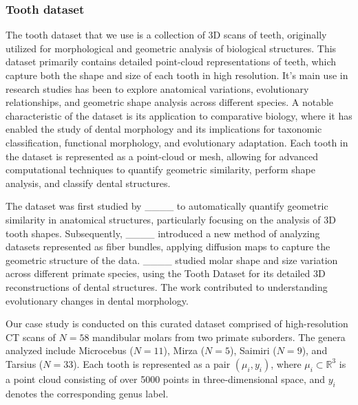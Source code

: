 \subsubsection{Tooth dataset}

The tooth dataset that we use is a collection of 3D scans of teeth, originally utilized for morphological and geometric analysis of biological structures. This dataset primarily contains detailed point-cloud representations of teeth, which capture both the shape and size of each tooth in high resolution. It's main use in research studies has been to explore anatomical variations, evolutionary relationships, and geometric shape analysis across different species. A notable characteristic of the dataset is its application to comparative biology, where it has enabled the study of dental morphology and its implications for taxonomic classification, functional morphology, and evolutionary adaptation. Each tooth in the dataset is represented as a point-cloud or mesh, allowing for advanced computational techniques to quantify geometric similarity, perform shape analysis, and classify dental structures.

The dataset was first studied by ____ to automatically quantify geometric similarity in anatomical structures, particularly focusing on the analysis of 3D tooth shapes. Subsequently, ____ introduced a new method of analyzing datasets represented as fiber bundles, applying diffusion maps to capture the geometric structure of the data. ____ studied molar shape and size variation across different primate species, using the Tooth Dataset for its detailed 3D reconstructions of dental structures. The work contributed to understanding evolutionary changes in dental morphology.

Our case study is conducted on this curated dataset comprised of high-resolution CT scans of $N = 58$ mandibular molars from two primate suborders. The genera analyzed include Microcebus ($N = 11$), Mirza ($N = 5$), Saimiri ($N = 9$), and Tarsius ($N = 33$). Each tooth is represented as a pair $(\mu_i, y_i)$, where $\mu_i \subset \mathbb{R}^3$ is a point cloud consisting of over 5000 points in three-dimensional space, and $y_i$ denotes the corresponding genus label.